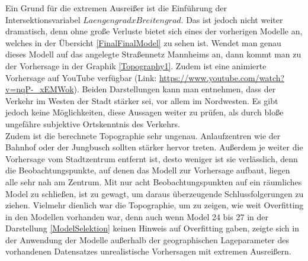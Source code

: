 \documentclass[a4paper,12pt]{thesis}
\begin{document}
Ein Grund für die extremen Ausreißer ist die Einführung der Intersektionsvariabel $LaengengradxBreitengrad$. Das ist jedoch nicht weiter dramatisch, denn ohne große Verluste bietet sich eines der vorherigen Modelle an, welches in der Übersicht \ref{FinalFinalModel} zu sehen ist. Wendet man genau dieses Modell auf das angelegte Straßennetz Mannheims an, dann kommt man zu der Vorhersage in der Graphik \ref{Topography1}. Zudem ist eine animierte Vorhersage auf YouTube verfügbar (Link: \url{https://www.youtube.com/watch?v=nqP-_xEMWok}). Beiden Darstellungen kann man entnehmen, dass der Verkehr im Westen der Stadt stärker sei, vor allem im Nordwesten. Es gibt jedoch keine Möglichkeiten, diese Aussagen weiter zu prüfen, als durch bloße ungefähre subjektive Ortskenntnis des Verkehrs.\\
Zudem ist die berechnete Topographie sehr ungenau. Anlaufzentren wie der Bahnhof oder der Jungbusch sollten stärker hervor treten. Außerdem je weiter die Vorhersage vom Stadtzentrum entfernt ist, desto weniger ist sie verlässlich, denn die Beobachtungspunkte, auf denen das Modell zur Vorhersage aufbaut, liegen alle sehr nah am Zentrum. Mit nur acht Beobachtungspunkten auf ein räumliches Model zu schließen, ist zu gewagt, um daraus überzeugende Schlussfolgerungen zu ziehen. Vielmehr dienlich war die Topographie, um zu zeigen, wie weit Overfitting in den Modellen vorhanden war, denn auch wenn Model 24 bis 27 in der Darstellung \ref{ModelSelektion} keinen Hinweis auf Overfitting gaben, zeigte sich in der Anwendung der Modelle außerhalb der geographischen Lageparameter des vorhandenen Datensatzes unrealistische Vorhersagen mit extremen Ausreißern.
\end{document}
